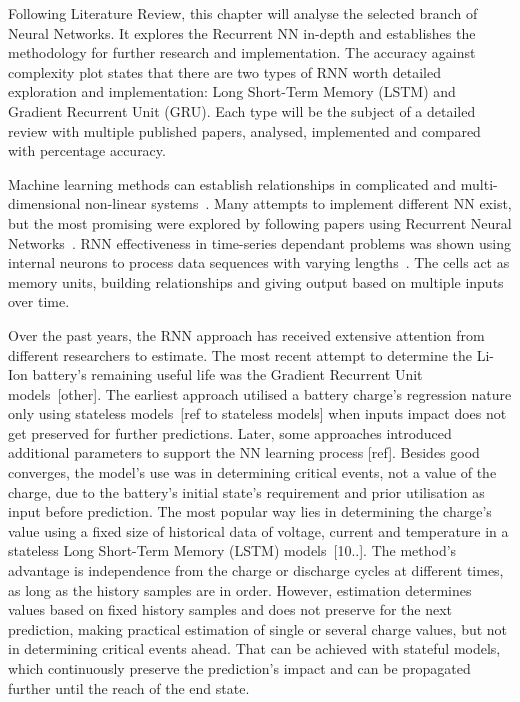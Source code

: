 Following Literature Review, this chapter will analyse the selected branch of Neural Networks.
It explores the Recurrent NN in-depth and establishes the methodology for further research and implementation.
The accuracy against complexity plot states that there are two types of RNN worth detailed exploration and implementation: Long Short-Term Memory (LSTM) and Gradient Recurrent Unit (GRU).
Each type will be the subject of a detailed review with multiple published papers, analysed, implemented and compared with percentage accuracy. 

%
%
Machine learning methods can establish relationships in complicated and multi-dimensional non-linear systems~\cite{hansen_support_2005,anton_battery_2013,he_state_2014}.
Many attempts to implement different NN exist, but the most promising were explored by following papers using Recurrent Neural Networks~\cite{song_lithium-ion_2018,Chemali2017,mamo_long_2020,jiao_gru-rnn_2020,xiao_accurate_2019,javid_adaptive_2020,zhang_deep_2020}.
RNN effectiveness in time-series dependant problems was shown using internal neurons to process data sequences with varying lengths~\cite{Chemali2017}.
The cells act as memory units, building relationships and giving output based on multiple inputs over time.

%
%
Over the past years, the RNN approach has received extensive attention from different researchers to estimate.
The most recent attempt to determine the Li-Ion battery's remaining useful life was the Gradient Recurrent Unit models~\cite{song_lithium-ion_2018}[other].
The earliest approach utilised a battery charge's regression nature only using stateless models~\cite{song_lithium-ion_2018}[ref to stateless models] when inputs impact does not get preserved for further predictions.
Later, some approaches introduced additional parameters to support the NN learning process [ref].
Besides good converges, the model's use was in determining critical events, not a value of the charge, due to the battery's initial state's requirement and prior utilisation as input before prediction.
The most popular way lies in determining the charge's value using a fixed size of historical data of voltage, current and temperature in a stateless Long Short-Term Memory (LSTM) models~\cite{Chemali2017}[10..].
The method's advantage is independence from the charge or discharge cycles at different times, as long as the history samples are in order.
However, estimation determines values based on fixed history samples and does not preserve for the next prediction, making practical estimation of single or several charge values, but not in determining critical events ahead.
That can be achieved with stateful models, which continuously preserve the prediction's impact and can be propagated further until the reach of the end state.

